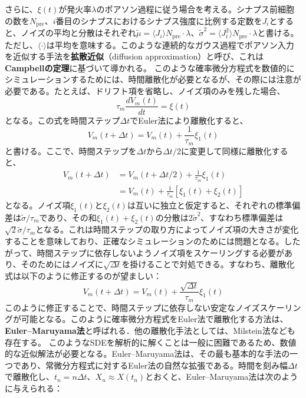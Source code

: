 さらに、$\xi(t)$が発火率$\lambda$のポアソン過程に従う場合を考える。シナプス前細胞の数を$N_\text{pre}$、$i$番目のシナプスにおけるシナプス強度に比例する定数を$J_i$とすると、ノイズの平均と分散はそれぞれ$\tilde{\mu} = \langle J_i \rangle N_\text{pre} \cdot \lambda$、$\tilde{\sigma}^2 = \langle J_i^2 \rangle N_\text{pre} \cdot \lambda$と書ける。ただし、$\langle \cdot \rangle$は平均を意味する。このような連続的なガウス過程でポアソン入力を近似する手法を\textbf{拡散近似}（diffusion approximation）と呼び、これは\textbf{Campbellの定理}に基づいて導かれる。
このような確率微分方程式を数値的にシミュレーションするためには、時間離散化が必要となるが、その際には注意が必要である。たとえば、ドリフト項を省略し、ノイズ項のみを残した場合、
\begin{equation}
\tau_m \frac{dV_m(t)}{dt} = \xi(t)
\end{equation}
となる。この式を時間ステップ$\Delta t$でEuler法により離散化すると、
\begin{equation}
V_m(t + \Delta t) = V_m(t) + \frac{1}{\tau_m} \xi_1(t)
\end{equation}
と書ける。ここで、時間ステップを$\Delta t$から$\Delta t/2$に変更して同様に離散化すると、
\begin{align}
V_m(t + \Delta t) &= V_m(t + \Delta t/2) + \frac{1}{\tau_m} \xi_1(t) \\
&= V_m(t) + \frac{1}{\tau_m} \left[ \xi_1(t) + \xi_2(t) \right]
\end{align}
となる。ノイズ項$\xi_1(t)$と$\xi_2(t)$は互いに独立と仮定すると、それぞれの標準偏差は$\tilde{\sigma}/\tau_m$であり、その和$\xi_1(t) + \xi_2(t)$の分散は$2\tilde{\sigma}^2$、すなわち標準偏差は$\sqrt{2} \tilde{\sigma}/\tau_m$となる。これは時間ステップの取り方によってノイズ項の大きさが変化することを意味しており、正確なシミュレーションのためには問題となる。したがって、時間ステップに依存しないようノイズ項をスケーリングする必要があり、そのためにはノイズに$\sqrt{\Delta t}$を掛けることで対処できる。すなわち、離散化式は以下のように修正するのが望ましい：
\begin{equation}
V_m(t + \Delta t) = V_m(t) + \frac{\sqrt{\Delta t}}{\tau_m} \xi_1(t)
\end{equation}
このように修正することで、時間ステップに依存しない安定なノイズスケーリングが可能となる。このように確率微分方程式をEuler法で離散化する方法は、\textbf{Euler–Maruyama法}と呼ばれる．他の離散化手法としては、Milstein法なども存在する。
このようなSDEを解析的に解くことは一般に困難であるため、数値的な近似解法が必要となる。Euler–Maruyama法は、その最も基本的な手法の一つであり、常微分方程式に対するEuler法の自然な拡張である。時間を刻み幅$\Delta t$で離散化し、$t_n = n \Delta t$、$X_n \approx X(t_n)$とおくと、Euler–Maruyama法は次のように与えられる：
